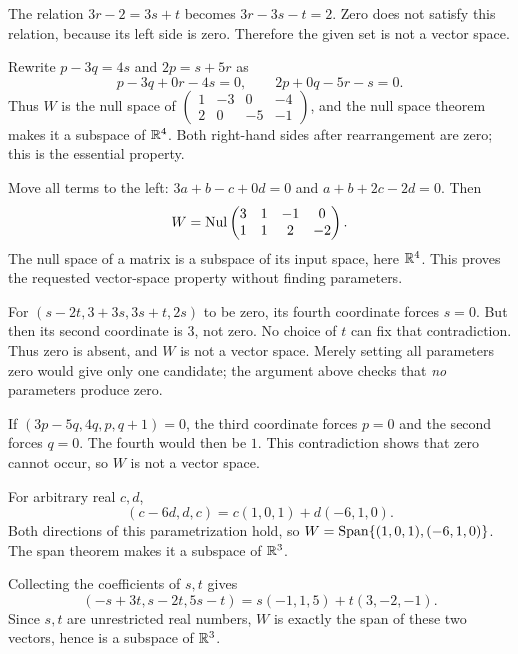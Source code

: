 The relation $3r-2=3s+t$ becomes $3r-3s-t=2$.
Zero does not satisfy this relation, because its left side is zero.
Therefore the given set is not a vector space.

Rewrite $p-3q=4s$ and $2p=s+5r$ as
\[
 p-3q+0r-4s=0,\qquad 2p+0q-5r-s=0.
\]
Thus $W$ is the null space of
$\left(\begin{smallmatrix}1&-3&0&-4\\2&0&-5&-1\end{smallmatrix}\right)$,
and the null space theorem makes it a subspace of $\mathbb{R}^4$. Both right-hand
sides after rearrangement are zero; this is the essential property.

Move all terms to the left:
$3a+b-c+0d=0$ and $a+b+2c-2d=0$.
Then
\[
 W=\operatorname{Nul}\begin{pmatrix}3&1&-1&0\\1&1&2&-2\end{pmatrix}.
\]
The null space of a matrix is a subspace of its input space, here $\mathbb{R}^4$.
This proves the requested vector-space property without finding parameters.

For $(s-2t,3+3s,3s+t,2s)$ to be zero, its fourth coordinate forces $s=0$.
But then its second coordinate is $3$, not zero. No choice of $t$ can fix
that contradiction. Thus zero is absent, and $W$ is not a vector space.
Merely setting all parameters zero would give only one candidate; the
argument above checks that \emph{no} parameters produce zero.

If $(3p-5q,4q,p,q+1)=0$, the third coordinate forces $p=0$ and the
second forces $q=0$. The fourth would then be $1$. This contradiction
shows that zero cannot occur, so $W$ is not a vector space.

For arbitrary real $c,d$,
\[
 (c-6d,d,c)=c(1,0,1)+d(-6,1,0).
\]
Both directions of this parametrization hold, so
$W=\operatorname{Span}\{(1,0,1),(-6,1,0)\}$. The span theorem makes it a subspace of $\mathbb{R}^3$.

Collecting the coefficients of $s,t$ gives
\[
 (-s+3t,s-2t,5s-t)=s(-1,1,5)+t(3,-2,-1).
\]
Since $s,t$ are unrestricted real numbers, $W$ is exactly the span of these
two vectors, hence is a subspace of $\mathbb{R}^3$.

